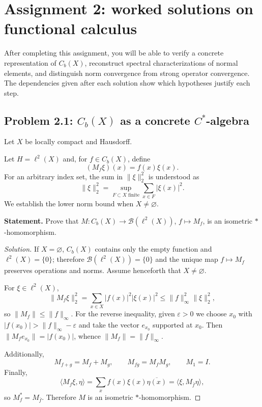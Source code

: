 \chapter{Assignment 2: worked solutions on functional calculus}

\begin{context}
After completing this assignment, you will be able to verify a concrete representation of $C_b(X)$, reconstruct
spectral characterizations of normal elements, and distinguish norm convergence from strong operator
convergence. The dependencies given after each solution show which hypotheses justify each step.
\end{context}

\section{Problem 2.1: \texorpdfstring{$C_b(X)$}{Cb(X)} as a concrete \texorpdfstring{$C^*$}{C-star}-algebra}

Let $X$ be locally compact and Hausdorff.


Let $H=\ell^2(X)$ and, for $f\in C_b(X)$, define
\[
 (M_f\xi)(x)=f(x)\xi(x).
\]
For an arbitrary index set, the sum in $\|\xi\|_2^2$ is understood as
\[
 \|\xi\|_2^2=\sup_{F\subset X\text{ finite}}\sum_{x\in F}|\xi(x)|^2.
\]
We establish the lower norm bound when $X\ne\varnothing$.

\noindent\textbf{Statement.} Prove that $M:C_b(X)\to\mathcal B(\ell^2(X))$, $f\mapsto M_f$, is an isometric $*$-homomorphism.

\begin{proof}[Solution]
If $X=\varnothing$, $C_b(X)$ contains only the empty function and $\ell^2(X)=\{0\}$; therefore
$\mathcal B(\ell^2(X))=\{0\}$ and the unique map $f\mapsto M_f$ preserves operations and
norms. Assume henceforth that $X\ne\varnothing$.

For $\xi\in\ell^2(X)$,
\[
\|M_f\xi\|_2^2
=\sum_{x\in X}|f(x)|^2|\xi(x)|^2
\le\|f\|_\infty^2\|\xi\|_2^2,
\]
so $\|M_f\|\le\|f\|_\infty$. For the reverse inequality, given
$\varepsilon>0$ we choose $x_0$ with $|f(x_0)|>\|f\|_\infty-\varepsilon$ and take the vector
$e_{x_0}$ supported at $x_0$. Then
$\|M_fe_{x_0}\|=|f(x_0)|$, whence $\|M_f\|=\|f\|_\infty$.

Additionally,
\[
M_{f+g}=M_f+M_g,
\qquad M_{fg}=M_fM_g,
\qquad M_1=I.
\]
Finally,
\[
\langle M_f\xi,\eta\rangle
=\sum_x f(x)\xi(x)\overline{\eta(x)}
=\langle \xi,M_{\bar f}\eta\rangle,
\]
so $M_f^*=M_{\bar f}$. Therefore $M$ is an isometric $*$-homomorphism.
\end{proof}

